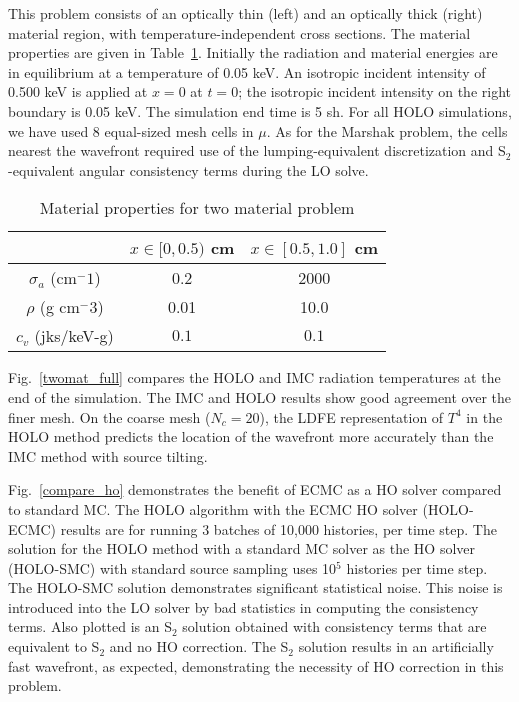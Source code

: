 This problem consists of an optically thin (left) and an optically thick (right) material region,
with temperature-independent cross sections.  The material properties are given in
Table~\ref{two_mat_props}.  Initially the radiation and material energies are in
equilibrium at a temperature of 0.05 keV.  An isotropic incident intensity of 0.500 keV
is applied at $x=0$ at $t=0$; the isotropic incident intensity on the right boundary is 0.05
keV.  The simulation end time is 5 sh. For all HOLO simulations, we have used 8
equal-sized mesh cells in $\mu$.  As for the Marshak problem, the cells nearest the wavefront required use of the lumping-equivalent discretization and
S$_2$-equivalent angular consistency terms during the LO solve.
\begin{table}[H]
        \caption{Material properties for two material problem\label{two_mat_props}}
\centering
        \begin{tabular}{|c|cc|}  \cline{2-3}
            \multicolumn{1}{c|}{}   & $x \in [0,0.5)$ cm & $x \in [0.5,1.0]$ cm   \\ \hline
            $\sigma_a$ (cm$^-1$)  & 0.2 & 2000 \\
            $\rho$ (g cm$^-3$) & 0.01 & 10.0 \\
            $c_v$ (jks/keV-g) & $0.1$ & $0.1$ \\ \hline
        \end{tabular}
\end{table}

Fig.~\ref{twomat_full} compares the HOLO and IMC radiation 
temperatures at the end of the simulation. The
IMC and HOLO results show good agreement
over the finer mesh.
On the coarse mesh ($N_c=20$), the LDFE representation of $T^4$ in the HOLO method predicts the location of the
wavefront more accurately than the IMC method with source tilting.

Fig.~\ref{compare_ho} demonstrates the benefit of ECMC as a HO solver compared to
standard MC.  The HOLO algorithm
with the ECMC HO solver (HOLO-ECMC) results
are for running 3 batches of 10,000 histories, per time step. The solution for the HOLO method with a standard MC solver as the HO solver
(HOLO-SMC) with standard source sampling uses 10$^5$ histories per time step. The HOLO-SMC solution demonstrates significant
statistical noise.  This noise is introduced into the LO solver by bad statistics in
computing the consistency terms. Also
plotted is an S$_2$ solution obtained with consistency terms that are equivalent
to S$_2$ and no HO correction.  The S$_2$ solution results in an artificially fast
wavefront, as expected, demonstrating the necessity of HO correction in this problem.


